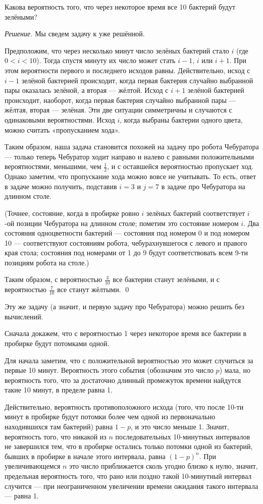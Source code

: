 \documentclass{article}
\begin{document}
Какова вероятность того, что через некоторое время все 10 бактерий будут зелёными?

\medskip
\noindent\textit{Решение.}
Мы сведем задачу к уже решённой.


Предположим, что через несколько минут 
число зелёных бактерий стало $i$ (где $0<i<10$).
Тогда спустя минуту их число может стать $i-1$, $i$ или $i+1$.
При этом вероятности первого и последнего исходов равны.
Действительно, исход с $i-1$ зелёной бактерией происходит, когда первая
бактерия случайно выбранной пары оказалась зелёной, а вторая --- жёлтой.
Исход с $i+1$ зелёной бактерией происходит, наоборот, когда первая бактерия случайно выбранной пары --- жёлтая, вторая --- зелёная. Эти две ситуации симметричны и случаются с одинаковыми вероятностями.
Исход $i$, когда выбраны бактерии одного цвета, можно считать «пропусканием хода». 

Таким образом, наша задача становится похожей на задачу про робота Чебуратора --- только теперь Чебуратор ходит направо и налево с равными положительными вероятностями, меньшими, чем $\tfrac12$, и с оставшейся вероятностью пропускает ход.
Однако заметим, что пропускание хода можно вовсе не учитывать.
То есть, ответ в задаче можно получить, подставив $i=3$ и $j=7$ в задаче про Чебуратора на длинном столе.

(Точнее, состояние, когда в пробирке ровно $i$ зелёных бактерий
соответствует $i$-ой позиции Чебуратора на длинном столе; пометим это состояние номером $i$.
Два состояния одноцветности бактерий --- состояния под номером 0 и под номером 10 ---  соответствуют состояниям робота, чебурахнувшегося с левого и правого края стола; состояния под номерами от 1 до 9 будут соответствовать всем 9-ти позициям робота на столе.)

Таким образом, с вероятностью $\tfrac{3}{10}$ все бактерии станут зелёными, 
и с вероятностью $\tfrac{7}{10}$ все станут жёлтыми.
\qed
\medskip

Эту же задачу (а значит, и первую задачу про Чебуратора)
можно решить без вычислений.

Сначала докажем, что с вероятностью 1
через некоторое время все бактерии в пробирке будут потомками одной.

Для начала заметим, что с положительной вероятностью это может случиться за первые 10 минут. 
Вероятность этого события (обозначим это число $p$) мала,
но вероятность того, что за достаточно длинный промежуток времени найдутся такие 10 минут, в пределе равна 1. 

Действительно, вероятность противоположного исхода (того, что после 10-ти минут в пробирке будут потомки более чем одной из первоначально находившихся там бактерий) равна $1-p$, и это число меньше 1. 
Значит, вероятность того, что никакой из $n$ последовательных 10-минутных интервалов не завершился тем, что в пробирке остались только потомки одной из бактерий, бывших в пробирке в начале этого интервала, равна $(1-p)^n$. 
При увеличивающемся $n$ это число приближается сколь угодно близко к нулю, значит, предельная вероятность того, что рано или поздно такой 10-минутный интервал случится --- при неограниченном увеличении времени ожидания такого интервала --- равна 1. 
\end{document}
